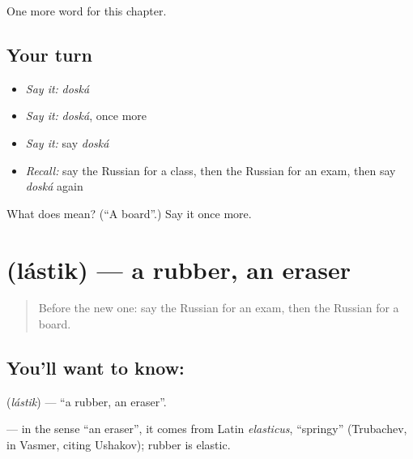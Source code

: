 \begin{grammarlens}[title={What you've built}]
One more word for this chapter.
\end{grammarlens}

\subsection*{Your turn}
\begin{itemize}
\raggedright
  \item \emph{Say it:} \emph{doská}
  \item \emph{Say it:} \emph{doská}, once more
  \item \emph{Say it:} say \emph{doská}
  \item \emph{Recall:} say the Russian for a class, then the Russian for an exam, then say \emph{doská} again
\end{itemize}

\begin{tcolorbox}[breakable,colback=teal!4,colframe=teal!35!black,title={Before you move on}]
What does  mean? (\textquotedblleft{}A board\textquotedblright{}.) Say it once more.
\end{tcolorbox}
\section[\texorpdfstring{\ru{ластик} (lástik)}{ластик (lástik)}]{ (lástik) — a rubber, an eraser}

\label{lesson:RU-C111-rubber}



\begin{quote}
Before the new one: say the Russian for an exam, then the Russian for a board.
\end{quote}

\subsection*{You'll want to know: }
\textbf{} (\emph{lástik}) — \textquotedblleft{}a rubber, an eraser\textquotedblright{}.

\begin{cousinweb}
\textbf{} — in the sense \textquotedblleft{}an eraser\textquotedblright{}, it comes from Latin \emph{elasticus}, \textquotedblleft{}springy\textquotedblright{} (Trubachev, in Vasmer, citing Ushakov); rubber is elastic.
\end{cousinweb}

